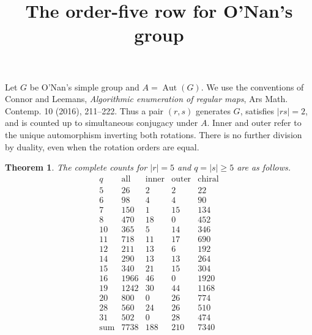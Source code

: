 \documentclass[11pt]{article}
\title{The order-five row for O'Nan's group}
\author{}\date{}
\newtheorem{theorem}{Theorem}
\newcommand{\Aut}{\operatorname{Aut}}
\begin{document}
\maketitle
Let $G$ be O'Nan's simple group and $A=\Aut(G)$. We use the conventions
of Connor and Leemans, \emph{Algorithmic enumeration of regular maps},
Ars Math. Contemp. 10 (2016), 211--222. Thus a pair $(r,s)$ generates
$G$, satisfies $|rs|=2$, and is counted up to simultaneous conjugacy
under $A$. Inner and outer refer to the unique automorphism inverting
both rotations. There is no further division by duality, even when the
rotation orders are equal.

\begin{theorem}
The complete counts for $|r|=5$ and $q=|s|\ge5$ are as follows.
\[
\begin{array}{r|rrrr}
q&\mathrm{all}&\mathrm{inner}&\mathrm{outer}&\mathrm{chiral}\\\hline
5&26&2&2&22\\
6&98&4&4&90\\
7&150&1&15&134\\
8&470&18&0&452\\
10&365&5&14&346\\
11&718&11&17&690\\
12&211&13&6&192\\
14&290&13&13&264\\
15&340&21&15&304\\
16&1966&46&0&1920\\
19&1242&30&44&1168\\
20&800&0&26&774\\
28&560&24&26&510\\
31&502&0&28&474\\\hline
\mathrm{sum}&7738&188&210&7340
\end{array}
\]
\end{theorem}
\end{document}

